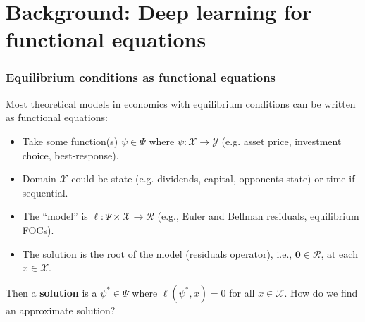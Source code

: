 \documentclass[aspectratio=169,10pt]{beamer}
\newcommand{\emphcolor}[1]{\textbf{\textcolor{emphcolorval}{#1}}}
\newcommand{\Xdom}{\mathcal{X}}
\newcommand{\Yrange}{\mathcal{Y}}
\newcommand{\Resid}{\mathcal{R}}
\begin{document}
\section{\textcolor{PennBlue}{Background: Deep learning for functional equations}}

\begin{frame}
	\frametitle{Equilibrium conditions as functional equations}
	Most theoretical models in economics with equilibrium conditions can be written as functional equations:
	\begin{itemize}
		\item Take some function(s) $\psi \in \varPsi$ where $\psi : \Xdom\to \Yrange$ (e.g. asset price, investment choice, best-response).\vspace{0.1in}
		\item Domain $\Xdom$ could be state (e.g. dividends, capital, opponents state) or time if sequential.\vspace{0.1in}
		\item The ``model'' is $\ell: \varPsi \times \Xdom \rightarrow \Resid$ (e.g., Euler and Bellman residuals, equilibrium FOCs).\vspace{0.1in}
		\item The solution is the root of the model (residuals operator), i.e., $\mathbf{0} \in \Resid$, at each $x \in \Xdom$.\vspace{0.1in}
	\end{itemize}
	Then a \emphcolor{solution} is a $\psi^*\in \varPsi$ where $\ell(\psi^*,x) = 0$ for all $x \in \Xdom$.  How do we find an approximate solution?\vspace{0.1in}
\end{frame}
\end{document}
